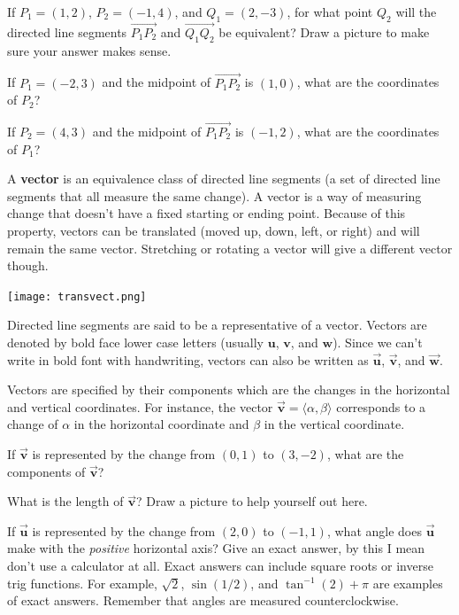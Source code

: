 \bq If $P_1=(1,2)$, $P_2=(-1,4)$, and $Q_1=(2,-3)$, for what point $Q_2$ will the directed line segments $\overrightarrow{P_1 P_2}$ and $\overrightarrow{Q_1 Q_2}$ be equivalent? Draw a picture to make sure your answer makes sense.
\eq

\bq If $P_1=(-2,3)$ and the midpoint of $\overrightarrow{P_1 P_2}$ is $(1,0)$, what are the coordinates of $P_2$?
\eq

\bq If $P_2=(4,3)$ and the midpoint of $\overrightarrow{P_1 P_2}$ is $(-1,2)$, what are the coordinates of $P_1$?
\eq


\begin{info} A \textbf{vector} is an equivalence class of directed line segments (a set of directed line segments that all  measure the same change). A vector is a way of measuring change that doesn't have a fixed starting or ending point. Because of this property, vectors can be translated (moved up, down, left, or right) and will remain the same vector. Stretching or rotating a vector will give a different vector though.

\texttt{[image: transvect.png]}

Directed line segments are said to be a representative of a vector. Vectors are denoted by bold face lower case letters (usually $\textbf{u}$, $\textbf{v}$, and $\textbf{w}$). Since we can't write in bold font with handwriting, vectors can also be written as $\vec{\textbf{u}}$, $\vec{\textbf{v}}$, and $\vec{\textbf{w}}$.

Vectors are specified by their components which are the changes in the horizontal and vertical coordinates. For instance, the vector $\vec{\textbf{v}}= \langle \alpha,\beta \rangle $ corresponds to a change of $\alpha$ in the horizontal coordinate and $\beta$ in the vertical coordinate.

\end{info}

\bq \be
\item If $\vec{\textbf{v}}$ is represented by the change from $(0,1)$ to $(3,-2)$, what are the components of $\vec{\textbf{v}}$?
\item What is the length of $\vec{\textbf{v}}$? Draw a picture to help yourself out here.
\ee
\eq

\bq If $\vec{\textbf{u}}$ is represented by the change from $(2,0)$ to $(-1,1)$, what angle does $\vec{\textbf{u}}$ make with the \emph{positive} horizontal axis? Give an exact answer, by this I mean don't use a calculator at all. Exact answers can include square roots or inverse trig functions. For example, $\sqrt{2}$, $\sin(1/2)$, and $\tan^{-1}(2)+\pi$ are examples of exact answers. Remember that angles are measured counterclockwise.
\eq

